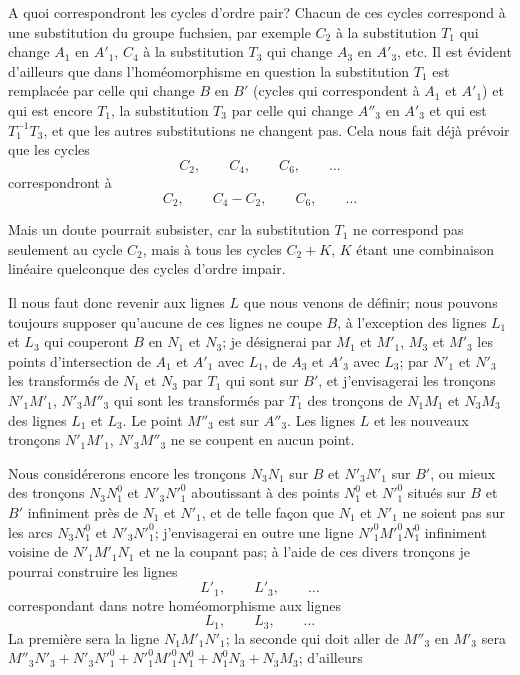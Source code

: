 \documentclass{article}
\begin{document}

A quoi correspondront les cycles d'ordre pair? Chacun de ces cycles correspond à une substitution du groupe fuchsien, par exemple $C_{2}$ à la substitution $T_{1}$ qui change $A_{1}$ en $A'_{1}$, $C_{4}$ à la substitution $T_{3}$ qui change $A_{3}$ en $A'_{3}$, etc. Il est évident d'ailleurs que dans l'homéomorphisme en question la substitution $T_{1}$ est remplacée par celle qui change $B$ en $B'$ (cycles qui correspondent à $A_{1}$ et $A'_{1}$) et qui est encore $T_{1}$, la substitution $T_{3}$ par celle qui change $A''_{3}$ en $A'_{3}$ et qui est $T^{-1}_{1} T_{3}$, et que les autres substitutions ne changent pas. Cela nous fait déjà prévoir que les cycles
\[ C_{2}, \qquad C_{4}, \qquad C_{6}, \qquad \ldots \]
correspondront à
\[ C_{2}, \qquad C_{4} - C_{2}, \qquad C_{6}, \qquad \ldots \]

Mais un doute pourrait subsister, car la substitution $T_{1}$ ne correspond pas seulement au cycle $C_{2}$, mais à tous les cycles $C_{2} + K$, $K$ étant une combinaison linéaire quelconque des cycles d'ordre impair.

Il nous faut donc revenir aux lignes $L$ que nous venons de définir; nous pouvons toujours supposer qu'aucune de ces lignes ne coupe $B$, à l'exception des lignes $L_{1}$ et $L_{3}$ qui couperont $B$ en $N_{1}$ et $N_{3}$; je désignerai par $M_{1}$ et $M'_{1}$, $M_{3}$ et $M'_{3}$ les points d'intersection de $A_{1}$ et $A'_{1}$ avec $L_{1}$, de $A_{3}$ et $A'_{3}$ avec $L_{3}$; par $N'_{1}$ et $N'_{3}$ les transformés de $N_{1}$ et $N_{3}$ par $T_{1}$ qui sont sur $B'$, et j'envisagerai les tronçons $N'_{1}M'_{1}$, $N'_{3}M''_{3}$ qui sont les transformés par $T_{1}$ des tronçons de $N_{1}M_{1}$ et $N_{3}M_{3}$ des lignes $L_{1}$ et $L_{3}$. Le point $M''_{3}$ est sur $A''_{3}$. Les lignes $L$ et les nouveaux tronçons $N'_{1}M'_{1}$, $N'_{3}M''_{3}$ ne se coupent en aucun point.

Nous considérerons encore les tronçons $N_{3}N_{1}$ sur $B$ et $N'_{3}N'_{1}$ sur $B'$, ou mieux des tronçons $N_{3}N^{0}_{1}$ et $N'_{3}N'^{0}_{1}$ aboutissant à des points $N^{0}_{1}$ et $N'^{0}_{1}$ situés sur $B$ et $B'$ infiniment près de $N_{1}$ et $N'_{1}$, et de telle façon que $N_{1}$ et $N'_{1}$ ne soient pas sur les arcs $N_{3}N^{0}_{1}$ et $N'_{3}N'^{0}_{1}$; j'envisagerai en outre une ligne $N'^{0}_{1}M'^{0}_{1}N^{0}_{1}$ infiniment voisine de $N'_{1}M'_{1}N_{1}$ et ne la coupant pas; à l'aide de ces divers tronçons je pourrai construire les lignes
\[ L'_{1}, \qquad L'_{3}, \qquad \ldots \]
correspondant dans notre homéomorphisme aux lignes
\[ L_{1}, \qquad L_{3}, \qquad \ldots \]
La première sera la ligne $N_{1}M'_{1}N'_{1}$; la seconde qui doit aller de $M''_{3}$ en $M'_{3}$ sera $M''_{3}N'_{3} + N'_{3}N'^{0}_{1} + N'^{0}_{1}M'^{0}_{1}N^{0}_{1} + N^{0}_{1}N_{3} + N_{3}M_{3}$; d'ailleurs
\end{document}
